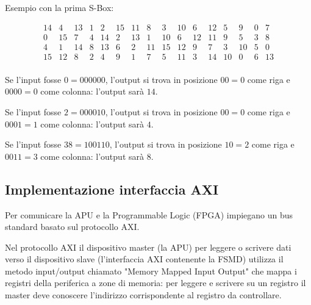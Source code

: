 \documentclass[a4paper]{article}
\begin{document}

Esempio con la prima S-Box:

$$
\begin{matrix}
14 & 4  & 13 & 1 & 2  & 15 & 11 & 8  & 3  & 10 & 6  & 12 & 5  & 9  & 0 & 7 \\
0  & 15 & 7  & 4 & 14 & 2  & 13 & 1  & 10 & 6  & 12 & 11 & 9  & 5  & 3 & 8 \\
4  & 1  & 14 & 8 & 13 & 6  & 2  & 11 & 15 & 12 & 9  & 7  & 3  & 10 & 5 & 0 \\
15 & 12 & 8  & 2 & 4  & 9  & 1  & 7  & 5  & 11 & 3  & 14 & 10 & 0  & 6 & 13 \\
\end{matrix}
$$

Se l'input fosse $0 = 000000$, l'output si trova in posizione $00 = 0$ come riga e $0000 = 0$ come colonna: l'output sarà $14$.

Se l'input fosse $2 = 000010$, l'output si trova in posizione $00 = 0$ come riga e $0001 = 1$ come colonna: l'output sarà $4$.

Se l'input fosse $38 = 100110$, l'output si trova in posizione $10 = 2$ come riga e $0011 = 3$ come colonna: l'output sarà $8$.


\subsection{Implementazione interfaccia AXI}

Per comunicare la APU e la Programmable Logic (FPGA) impiegano un bus standard basato sul protocollo AXI.

Nel protocollo AXI il dispositivo master (la APU) per leggere o scrivere dati verso il dispositivo slave (l'interfaccia AXI contenente la FSMD) utilizza il metodo input/output chiamato "Memory Mapped Input Output" che mappa i registri della periferica a zone di memoria:
per leggere e scrivere su un registro il master deve conoscere l'indirizzo corrispondente al registro da controllare.
\end{document}
